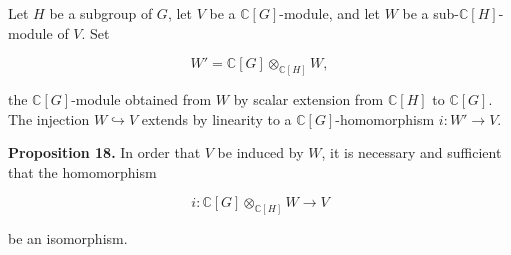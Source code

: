 Let $H$ be a subgroup of $G$, let $V$ be a $\mathbb{C}[G]$-module, and let $W$ be a sub-$\mathbb{C}[H]$-module of $V$. Set

$$W' = \mathbb{C}[G] \otimes_{\mathbb{C}[H]} W,$$

the $\mathbb{C}[G]$-module obtained from $W$ by scalar extension from $\mathbb{C}[H]$ to $\mathbb{C}[G]$. The injection $W \hookrightarrow V$ extends by linearity to a $\mathbb{C}[G]$-homomorphism $i: W' \to V$.

\textbf{Proposition 18.} In order that $V$ be induced by $W$, it is necessary and sufficient that the homomorphism

$$i: \mathbb{C}[G] \otimes_{\mathbb{C}[H]} W \to V$$

be an isomorphism.
